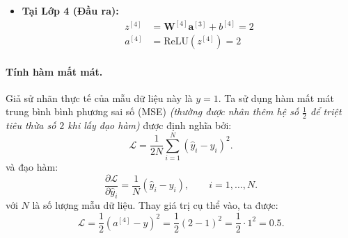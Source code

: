 \begin{itemize}
    \item \textbf{Tại Lớp 4 (Đầu ra):}
    \begin{align*}
    z^{[4]} &= \mathbf{W}^{[4]}\mathbf{a}^{[3]} + b^{[4]} = 2 \\
    a^{[4]} &= \text{ReLU}(z^{[4]}) = 2
    \end{align*}
\end{itemize}

\paragraph{Tính hàm mất mát.\\}
Giả sử nhãn thực tế của mẫu dữ liệu này là $y = 1$. Ta sử dụng hàm mất mát trung bình bình phương sai số (MSE) \textit{(thường được nhân thêm hệ số $\frac{1}{2}$ để triệt tiêu thừa số $2$ khi lấy đạo hàm)} được định nghĩa bởi:
\begin{equation}
    \mathcal{L}
    = \frac{1}{2N}\sum_{i=1}^{N}(\hat{y}_i-y_i)^2.
\end{equation}
và đạo hàm:
\begin{equation}
    \frac{\partial \mathcal{L}}
         {\partial \hat{y}_i}
    = \frac{1}{N}(\hat{y}_i-y_i),
    \qquad i=1,\ldots,N.
\end{equation}
với $N$ là số lượng mẫu dữ liệu.
Thay giá trị cụ thể vào, ta được:
\begin{equation}
\mathcal{L} = \frac{1}{2} \left(a^{[4]} - y\right)^2 = \frac{1}{2} (2 - 1)^2 = \frac{1}{2} \cdot 1^2 = 0.5.
\end{equation}
